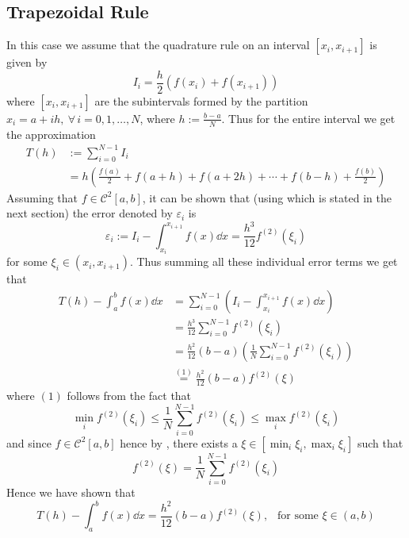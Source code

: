 \subsection{Trapezoidal Rule}

In this case we assume that the quadrature rule on an interval $[x_i, x_{i+1}]$ is given by 
\begin{equation}\label{eq2:apr4A}
    I_i = \frac{h}{2}(f(x_i) + f(x_{i+1}))
\end{equation}
where $[x_i,x_{i+1}]$ are the subintervals formed by the partition $x_i = a + ih, \ \forall \, i = 0,1, \dots, N$, where $h := \frac{b-a}{N}$. Thus for the entire interval we get the approximation 
\begin{align*}
    T(h) &:= \sum_{i=0}^{N-1} I_i \\ 
    &= h\left( \frac{f(a)}{2} + f(a+h) + f(a+2h) + \cdots + f(b-h) + \frac{f(b)}{2}  \right) 
\end{align*}
Assuming that $f \in \mathcal{C}^2[a,b]$, it can be shown that (using  which is stated in the next section) the error denoted by $\varepsilon_i$ is 
\begin{equation}\label{eq3:apr4A}
    \varepsilon_i := I_i - \int_{x_i}^{x_{i+1}} f(x) \dd{x} = \frac{h^3}{12} f^{(2)} (\xi_i) 
\end{equation}
for some $\xi_i \in (x_i, x_{i+1})$. Thus summing all these individual error terms we get that 
\begin{align*}
    T(h) - \int_a^b f(x) \dd{x} 
    &= \sum_{i=0}^{N-1} \left( I_i - \int_{x_i}^{x_{i+1}} f(x) \dd{x} \right) \\ 
    &= \frac{h^3}{12}\sum_{i=0}^{N-1} f^{(2)}(\xi_i) \\ 
    &= \frac{h^2}{12}(b-a) \left( \frac{1}{N} \sum_{i=0}^{N-1} f^{(2)}(\xi_i)\right) \\ 
    &\overset{(1)}{=} \frac{h^2}{12}(b-a) f^{(2)}(\xi)
\end{align*}
where $(1)$ follows from the fact that 
\[
    \min_{i} f^{(2)}(\xi_i) \leq \frac{1}{N} \sum_{i=0}^{N-1} f^{(2)}(\xi_i) \leq \max_{i} f^{(2)}(\xi_i)   
\]
and since $f \in \mathcal{C}^2[a,b]$ hence by , there exists a $\xi \in \left[ \min_i \xi_i, \max_i \xi_i \right]$ such that 
\[
    f^{(2)}(\xi) = \frac{1}{N} \sum_{i=0}^{N-1} f^{(2)}(\xi_i)  
\]
Hence we have shown that 
\begin{equation}\label{eq4:apr4A}
    T(h) - \int_a^b f(x) \dd{x} = \frac{h^2}{12} (b-a) f^{(2)}(\xi), \ \ \mbox{ for some } \xi \in (a,b)
\end{equation}
